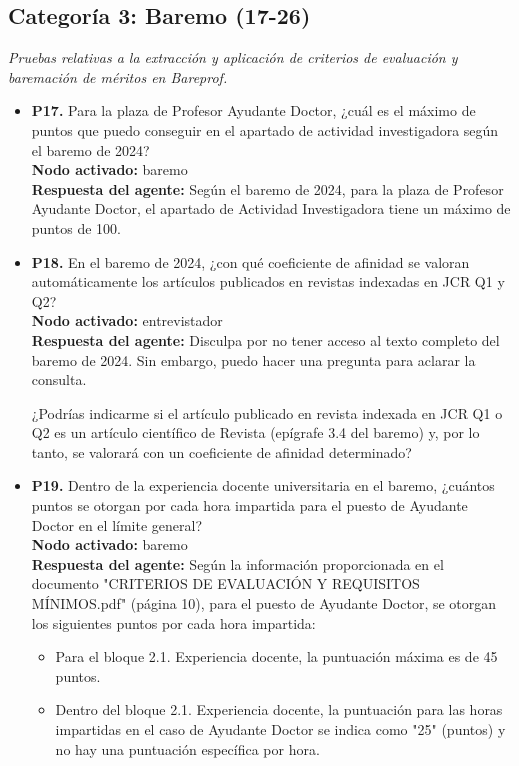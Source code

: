 \documentclass{article}
\begin{document}
\subsection{Categoría 3: Baremo (17-26)}
\textit{Pruebas relativas a la extracción y aplicación de criterios de evaluación y baremación de méritos en Bareprof.}
\begin{itemize}
      \item \textbf{P17.} Para la plaza de Profesor Ayudante Doctor, ¿cuál es el máximo de puntos que puedo conseguir en el apartado de actividad investigadora según el baremo de 2024? \\
            \textbf{Nodo activado:} baremo \\
            \textbf{Respuesta del agente:} Según el baremo de 2024, para la plaza de Profesor Ayudante Doctor, el apartado de Actividad Investigadora tiene un máximo de puntos de 100.

      \item \textbf{P18.} En el baremo de 2024, ¿con qué coeficiente de afinidad se valoran automáticamente los artículos publicados en revistas indexadas en JCR Q1 y Q2? \\
            \textbf{Nodo activado:} entrevistador \\
            \textbf{Respuesta del agente:} Disculpa por no tener acceso al texto completo del baremo de 2024. Sin embargo, puedo hacer una pregunta para aclarar la consulta.

            ¿Podrías indicarme si el artículo publicado en revista indexada en JCR Q1 o Q2 es un artículo científico de Revista (epígrafe 3.4 del baremo) y, por lo tanto, se valorará con un coeficiente de afinidad determinado?

      \item \textbf{P19.} Dentro de la experiencia docente universitaria en el baremo, ¿cuántos puntos se otorgan por cada hora impartida para el puesto de Ayudante Doctor en el límite general? \\
            \textbf{Nodo activado:} baremo \\
            \textbf{Respuesta del agente:} Según la información proporcionada en el documento "CRITERIOS DE EVALUACIÓN Y REQUISITOS MÍNIMOS.pdf" (página 10), para el puesto de Ayudante Doctor, se otorgan los siguientes puntos por cada hora impartida:

            \begin{itemize}
                \item Para el bloque 2.1. Experiencia docente, la puntuación máxima es de 45 puntos.
                \item Dentro del bloque 2.1. Experiencia docente, la puntuación para las horas impartidas en el caso de Ayudante Doctor se indica como "25" (puntos) y no hay una puntuación específica por hora.
            \end{itemize}


\end{itemize}
\end{document}
